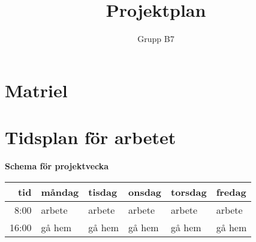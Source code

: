 \documentclass[]{article}
\title{Projektplan}
\author{Grupp B7}
\begin{document}
\maketitle



\section{Matriel}



\section{Tidsplan för arbetet}

\begin{center}
	{\textbf{Schema för projektvecka}}
\begin{tabular}{r | l l l l l }
	tid & måndag & tisdag & onsdag & torsdag & fredag \\ \hline
	8:00 & arbete & arbete & arbete & arbete & arbete \\
	16:00 & gå hem & gå hem & gå hem & gå hem & gå hem \\ \hline

\end{tabular}
\end{center}

\clearpage
\printbibliography
\end{document}
